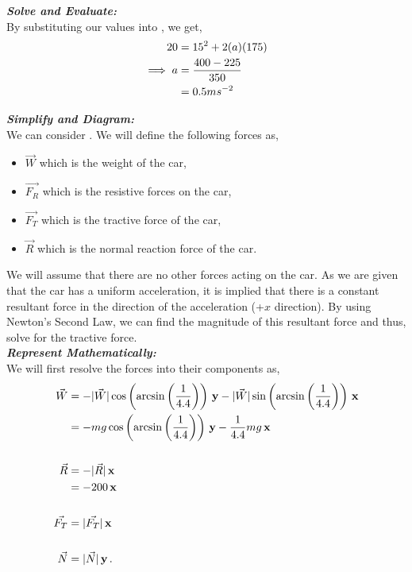 \begin{subquestions}
\begin{subsubquestions}
\textbf{\textit{Solve and Evaluate:}} \\
By substituting our values into , we get,
\begin{align}
	20 & = 15^2 + 2(a)(175) \nonumber \\
	\implies a & = \frac{400-225}{350} \nonumber \\
	  & = 0.5ms^{-2} 
\end{align}


\subsubquestion

\textbf{\textit{Simplify and Diagram:}} \\
We can consider . We will define the following forces as,
\begin{itemize}
	\item $\vec{W}$ which is the weight of the car,
	\item $\vec{F_R}$ which is the resistive forces on the car,
	\item $\vec{F_T}$ which is the tractive force of the car,
	\item $\vec{R}$ which is the normal reaction force of the car.
\end{itemize}
We will assume that there are no other forces acting on the car. As we are given that the car has a uniform acceleration, it is implied that there is a constant resultant force in the direction of the acceleration (+$x$ direction). By using Newton's Second Law, we can find the magnitude of this resultant force and thus, solve for the tractive force.\\



\textbf{\textit{Represent Mathematically:}} \\
We will first resolve the forces into their components as,
\begin{align}
	\vec{W} & = -|\vec{W}|\cos\left({\arcsin\left(\frac{1}{4.4}\right)}\right)\,\mathbf{y}-|\vec{W}|\sin\left({\arcsin\left(\frac{1}{4.4}\right)}\right)\,\mathbf{x} \nonumber \\
	        & = -mg\cos\left({\arcsin\left(\frac{1}{4.4}\right)}\right)\,\mathbf{y}-\frac{1}{4.4}mg\,\mathbf{x} \\ \nonumber \\
	\vec{R} & = -|\vec{R}|\,\mathbf{x} \nonumber \\
	        & = -200 \,\mathbf{x} \\ \nonumber \\
	\vec{F_T} & = |\vec{F_T}|\,\mathbf{x} \\ \nonumber \\
	\vec{N} & = |\vec{N}|\,\mathbf{y} \,.
\end{align}


\end{subsubquestions}
\end{subquestions}
